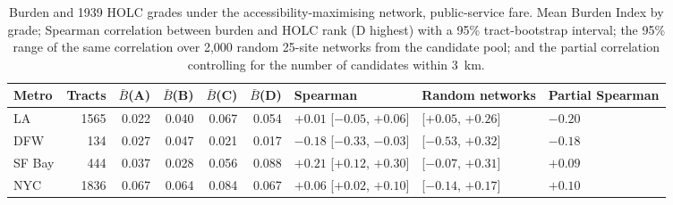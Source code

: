 \begin{table}[!htbp]
\centering
\caption{Burden and 1939 HOLC grades under the accessibility-maximising network, public-service fare. Mean Burden Index by grade; Spearman correlation between burden and HOLC rank (D highest) with a 95\% tract-bootstrap interval; the 95\% range of the same correlation over 2{,}000 random 25-site networks from the candidate pool; and the partial correlation controlling for the number of candidates within 3~km.}
\label{tab:holc}
\footnotesize
\begin{tabular}{lrrrrrlll}
\toprule
Metro & Tracts & $\bar B$(A) & $\bar B$(B) & $\bar B$(C) & $\bar B$(D) & Spearman & Random networks & Partial Spearman \\
\midrule
LA & 1565 & 0.022 & 0.040 & 0.067 & 0.054 & $+0.01$ [$-0.05$, $+0.06$] & [$+0.05$, $+0.26$] & $-0.20$ \\
DFW & 134 & 0.027 & 0.047 & 0.021 & 0.017 & $-0.18$ [$-0.33$, $-0.03$] & [$-0.53$, $+0.32$] & $-0.18$ \\
SF Bay & 444 & 0.037 & 0.028 & 0.056 & 0.088 & $+0.21$ [$+0.12$, $+0.30$] & [$-0.07$, $+0.31$] & $+0.09$ \\
NYC & 1836 & 0.067 & 0.064 & 0.084 & 0.067 & $+0.06$ [$+0.02$, $+0.10$] & [$-0.14$, $+0.17$] & $+0.10$ \\
\bottomrule
\end{tabular}
\end{table}
